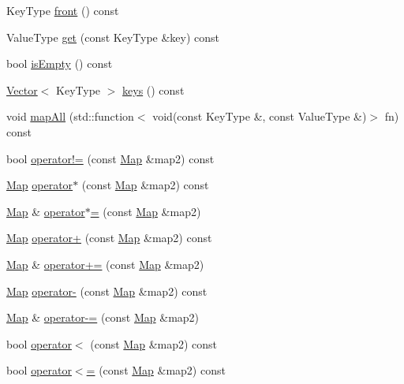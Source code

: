 \begin{DoxyCompactItemize}
Key\+Type \mbox{\hyperlink{classMap_a6e76878901fa73e176909ac015834f1a}{front}} () const
\item 
Value\+Type \mbox{\hyperlink{classMap_a3ac97b0a9a7fa131221427f628667ae9}{get}} (const Key\+Type \&key) const
\item 
bool \mbox{\hyperlink{classMap_acf82f9b2937375c7b1cf3dccb3df3312}{is\+Empty}} () const
\item 
\mbox{\hyperlink{classVector}{Vector}}$<$ Key\+Type $>$ \mbox{\hyperlink{classMap_a88e3a058d30d97a5ce6ae57608e7db17}{keys}} () const
\item 
void \mbox{\hyperlink{classMap_a57822037d00ad7cdbf2882e4ab91451d}{map\+All}} (std\+::function$<$ void(const Key\+Type \&, const Value\+Type \&)$>$ fn) const
\item 
bool \mbox{\hyperlink{classMap_a0a372de2f537b6d74ad13d6bd26f0414}{operator!=}} (const \mbox{\hyperlink{classMap}{Map}} \&map2) const
\item 
\mbox{\hyperlink{classMap}{Map}} \mbox{\hyperlink{classMap_a078716a91244790312e19db9daf692db}{operator$\ast$}} (const \mbox{\hyperlink{classMap}{Map}} \&map2) const
\item 
\mbox{\hyperlink{classMap}{Map}} \& \mbox{\hyperlink{classMap_a5d455253cf7b430025844b814f60f81d}{operator$\ast$=}} (const \mbox{\hyperlink{classMap}{Map}} \&map2)
\item 
\mbox{\hyperlink{classMap}{Map}} \mbox{\hyperlink{classMap_af25292376af863c7defa9dd9a378d383}{operator+}} (const \mbox{\hyperlink{classMap}{Map}} \&map2) const
\item 
\mbox{\hyperlink{classMap}{Map}} \& \mbox{\hyperlink{classMap_ac0478d198f73f2a6c45c03e453faa538}{operator+=}} (const \mbox{\hyperlink{classMap}{Map}} \&map2)
\item 
\mbox{\hyperlink{classMap}{Map}} \mbox{\hyperlink{classMap_a68704368f8cfa5ea173c0dfc95c75920}{operator-\/}} (const \mbox{\hyperlink{classMap}{Map}} \&map2) const
\item 
\mbox{\hyperlink{classMap}{Map}} \& \mbox{\hyperlink{classMap_a5c6ee663a9c3956c53220cfff8659f1c}{operator-\/=}} (const \mbox{\hyperlink{classMap}{Map}} \&map2)
\item 
bool \mbox{\hyperlink{classMap_aa7853d8fda7f6e2e8a353dfed157c376}{operator$<$}} (const \mbox{\hyperlink{classMap}{Map}} \&map2) const
\item 
bool \mbox{\hyperlink{classMap_a91d581dcc2a8ff2a83aa7854e9166dc9}{operator$<$=}} (const \mbox{\hyperlink{classMap}{Map}} \&map2) const
\item 

\end{DoxyCompactItemize}
